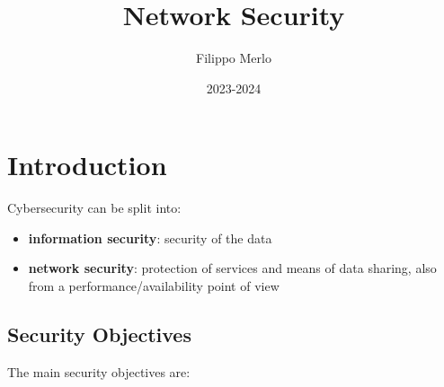 \documentclass[oneside]{academica}
\title{Network Security}
\author{Filippo Merlo}
\date{2023-2024}
\begin{document}
\frontmatter

\maketitle

\tableofcontents

\mainmatter

\chapter{Introduction}

Cybersecurity can be split into:
\begin{itemize}
  \item \textbf{information security}: security of the data
  \item \textbf{network security}: protection of services and means of data sharing, also from a performance/availability point of view
\end{itemize}

\section{Security Objectives}

The main security objectives are:
\end{document}
